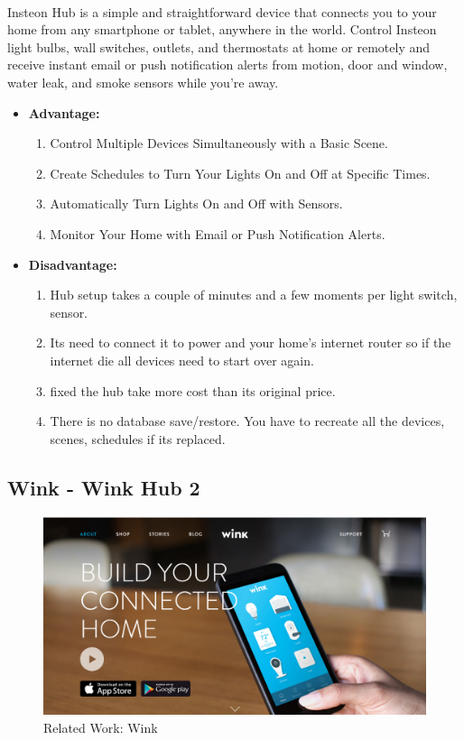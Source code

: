 \documentclass[12pt, oneside, a4paper]{book}
\newcommand\boldcolor[1]{\textcolor{bold}{\textbf{#1}}}
\begin{document}
		\paragraph{}Insteon Hub is a simple and straightforward device that connects you to your home from any smartphone or tablet, anywhere in the world. Control Insteon light bulbs, wall switches, outlets, and thermostats at home or remotely and receive instant email or push notification alerts from motion, door and window, water leak, and smoke sensors while you’re away\cite{insteon}.
		\begin{itemize}
		\item \boldcolor{Advantage:}
			\begin{enumerate}
				\item Control Multiple Devices Simultaneously with a Basic Scene.
				\item Create Schedules to Turn Your Lights On and Off at Specific Times.
				\item Automatically Turn Lights On and Off with Sensors.
				\item Monitor Your Home with Email or Push Notification Alerts.
			\end{enumerate}
		\item \boldcolor{Disadvantage:} 
			\begin{enumerate}
				\item Hub setup takes a couple of minutes and a few moments per light switch, sensor.
				\item Its need to connect it to power and your home's internet router so if the internet die all devices need to start over again. 
				\item fixed the hub take more cost than its original price.
				\item There is no database save/restore. You have to recreate all the devices, scenes, schedules if its replaced.
			\end{enumerate}
		\end{itemize}
		\newpage	
		\subsection{Wink - Wink Hub 2}
		\begin{figure}[H]
  			\caption{Related Work: Wink}
  			\includegraphics[width=\linewidth]{img/wink.png}
		\end{figure}
\end{document}
